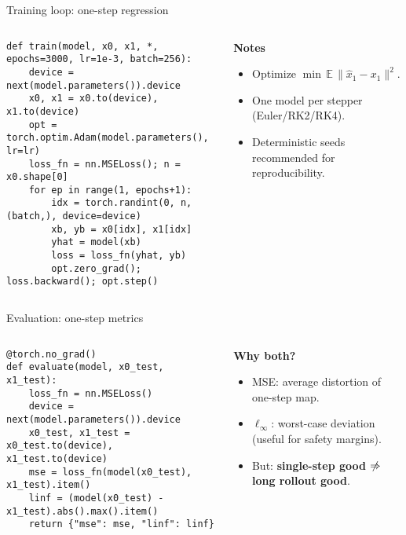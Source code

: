 \documentclass[aspectratio=169]{beamer}
\begin{document}
\begin{frame}[fragile]{Training loop: one-step regression}
\begin{columns}[T,totalwidth=\textwidth]
\begin{column}{0.62\textwidth}
\begin{lstlisting}[style=py,caption={Mini-batch MSE with Adam},label={lst:train}]
def train(model, x0, x1, *, epochs=3000, lr=1e-3, batch=256):
    device = next(model.parameters()).device
    x0, x1 = x0.to(device), x1.to(device)
    opt = torch.optim.Adam(model.parameters(), lr=lr)
    loss_fn = nn.MSELoss(); n = x0.shape[0]
    for ep in range(1, epochs+1):
        idx = torch.randint(0, n, (batch,), device=device)
        xb, yb = x0[idx], x1[idx]
        yhat = model(xb)
        loss = loss_fn(yhat, yb)
        opt.zero_grad(); loss.backward(); opt.step()
\end{lstlisting}
\end{column}
\begin{column}{0.38\textwidth}
\textbf{Notes}
\begin{itemize}
  \item Optimize $\min\,\mathbb E\,\|\hat x_1-x_1\|^2$.
  \item One model per stepper (Euler/RK2/RK4).
  \item Deterministic seeds recommended for reproducibility.
\end{itemize}
\end{column}
\end{columns}
\end{frame}

\begin{frame}[fragile]{Evaluation: one-step metrics}
\begin{columns}[T,totalwidth=\textwidth]
\begin{column}{0.54\textwidth}
\begin{lstlisting}[style=py,caption={MSE & L-infinity errors},label={lst:eval}]
@torch.no_grad()
def evaluate(model, x0_test, x1_test):
    loss_fn = nn.MSELoss()
    device = next(model.parameters()).device
    x0_test, x1_test = x0_test.to(device), x1_test.to(device)
    mse = loss_fn(model(x0_test), x1_test).item()
    linf = (model(x0_test) - x1_test).abs().max().item()
    return {"mse": mse, "linf": linf}
\end{lstlisting}
\end{column}
\begin{column}{0.46\textwidth}
\textbf{Why both?}
\begin{itemize}
  \item MSE: average distortion of one-step map.
  \item $\ell_\infty$: worst-case deviation (useful for safety margins).
  \item But: \textbf{single-step good} $\centernot\Rightarrow$ \textbf{long rollout good}.
\end{itemize}
\end{column}
\end{columns}
\end{frame}
\end{document}
